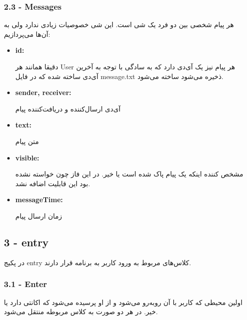 \documentclass[12pt]{article}
\begin{document}
\LTR
\begin{latin}
\subsubsection*{2.3 - Messages}
\end{latin}
\RTL
هر پیام شخصی بین دو فرد یک شی است. این شی خصوصیات زیادی ندارد ولی به آن‌ها می‌پردازیم:

\begin{itemize}

\item
\begin{latin}
\textbf{id:}
\end{latin}
دقیقا همانند هر User هر پیام نیز یک آی‌دی دارد که به سادگی با توجه به آخرین آی‌دی ساخته شده که در فایل message.txt ذخیره می‌شود ساخته می‌شود.

\item
\begin{latin}
\textbf{sender, receiver:}
\end{latin}
آی‌دی ارسال‌کننده و دریافت‌کننده پیام

\item
\begin{latin}
\textbf{text:}
\end{latin}
متن پیام

\item
\begin{latin}
\textbf{visible:}
\end{latin}
مشخص کننده اینکه یک پیام پاک شده است یا خیر. در این فاز چون خواسته نشده بود این قابلیت اضافه نشد.

\item
\begin{latin}
\textbf{messageTime:}
\end{latin}
زمان ارسال پیام

\end{itemize}

\LTR
\begin{latin}
\subsection*{3 - entry}
\end{latin}
\RTL
در پکیج entry کلاس‌های مربوط به ورود کاربر به برنامه قرار دارند.

\LTR
\begin{latin}
\subsubsection*{3.1 - Enter}
\end{latin}
\RTL
اولین محیطی که کاربر با آن روبه‌رو می‌شود و از او پرسیده می‌شود که اکانتی دارد یا خیر. در هر دو صورت به کلاس مربوطه منتقل می‌شود.
\end{document}
